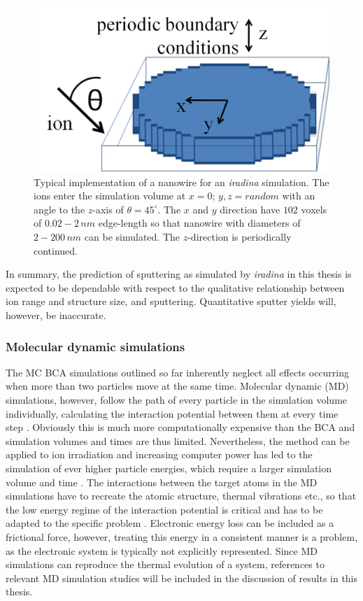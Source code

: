 \begin{figure}
	\centering
		\includegraphics[width=.5\textwidth]{images/voxel.jpg}
	\caption{Typical implementation of a nanowire for an \emph{iradina} simulation. The ions enter the simulation volume at $x=0$; $y,z=random$ with an angle to the $z$-axis of $\theta = 45^\circ$. The $x$ and $y$ direction have $102$ voxels of $0.02-2\,nm$ edge-length so that nanowire with diameters of $2-200\,nm$ can be simulated. The $z$-direction is periodically continued.}
	\label{voxel}
\end{figure} 

In summary, the prediction of sputtering as simulated by \emph{iradina} in this thesis is expected to be dependable with respect to the qualitative relationship between ion range and structure size, and sputtering. Quantitative sputter yields will, however, be inaccurate.


\subsubsection{Molecular dynamic simulations}

The MC BCA simulations outlined so far inherently neglect all effects occurring when more than two particles move at the same time. Molecular dynamic (MD) simulations, however, follow the path of every particle in the simulation volume individually, calculating the interaction potential between them at every time step \cite{alder_studies_1959}. Obviously this is much more computationally expensive than the BCA and simulation volumes and times are thus limited. Nevertheless, the method can be applied to ion irradiation \cite{nordlund_molecular_1995} and increasing computer power has led to the simulation of ever higher particle energies, which require a larger simulation volume and time \cite{greaves_enhanced_2013,baumer_prediction_2014,anders_sputtering_2015}. The interactions between the target atoms in the MD simulations have to recreate the atomic structure, thermal vibrations etc., so that the low energy regime of the interaction potential is critical and has to be adapted to the specific problem \cite{dedkov_interatomic_1995,nordlund_repulsive_1997,albe_modeling_2002,nordlund_interatomic_2008}. Electronic energy loss can be included as a frictional force, however, treating this energy in a consistent manner is a problem, as the electronic system is typically not explicitly represented. Since MD simulations can reproduce the thermal evolution of a system, references to relevant MD simulation studies will be included in the discussion of results in this thesis.


